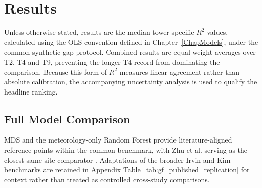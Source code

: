 \FloatBarrier

\section{Results}

Unless otherwise stated, results are the median tower-specific \(R^2\) values,
calculated using the OLS convention defined in Chapter~\ref{ChapModels}, under
the common synthetic-gap protocol. Combined results are equal-weight
averages over T2, T4 and T9, preventing the longer T4 record from
dominating the comparison. Because this form of \(R^2\) measures linear
agreement rather than absolute calibration, the accompanying uncertainty
analysis is used to qualify the headline ranking.

\subsection{Full Model Comparison}

MDS and the meteorology-only Random Forest provide literature-aligned reference
points within the common benchmark, with Zhu et al. serving as the closest
same-site comparator \cite{zhu2023a}. Adaptations of the broader Irvin and Kim
benchmarks are retained in Appendix Table~\ref{tab:gf_published_replication} for
context rather than treated as controlled cross-study comparisons.

